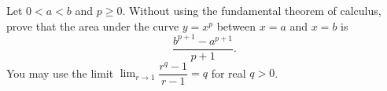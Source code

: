 Let $0<a<b$ and $p\ge0$. Without using the fundamental theorem of calculus, prove that the area under the curve $y=x^p$ between $x=a$ and $x=b$ is
\[\dfrac{b^{p+1}-a^{p+1}}{p+1}.\]
You may use the limit $\displaystyle\lim_{r\to1}\dfrac{r^q-1}{r-1}=q$ for real $q>0$.

